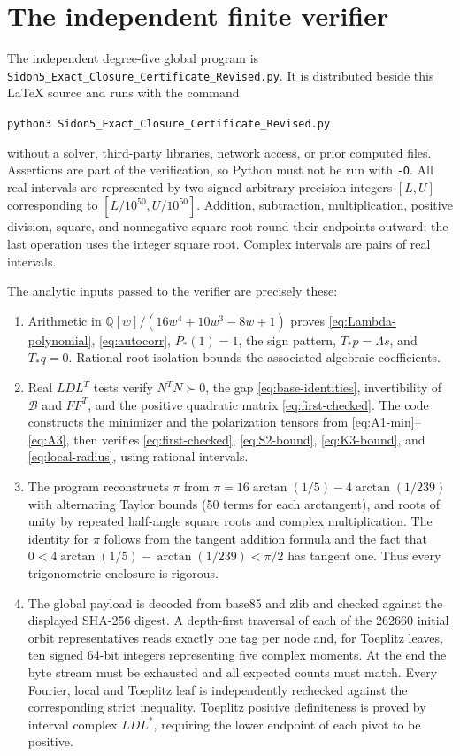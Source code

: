 \documentclass[11pt]{article}
\newcommand{\Q}{\mathbb Q}
\newcommand{\cert}{\texttt{Sidon5\_Exact\_Closure\_Certificate\_Revised.py}}
\begin{document}
\section{The independent finite verifier}\label{app:certificate}

The independent degree-five global program is \cert{}. It is distributed beside this \LaTeX{} source and runs with the command
\begin{center}\texttt{python3 Sidon5\_Exact\_Closure\_Certificate\_Revised.py}\end{center}
without a solver, third-party libraries, network access, or prior computed files. Assertions are part of the verification, so Python must not be run with \texttt{-O}. All real intervals are represented by two signed arbitrary-precision integers $[L,U]$ corresponding to $[L/10^{50},U/10^{50}]$. Addition, subtraction, multiplication, positive division, square, and nonnegative square root round their endpoints outward; the last operation uses the integer square root. Complex intervals are pairs of real intervals.

The analytic inputs passed to the verifier are precisely these:
\begin{enumerate}[leftmargin=*]
\item Arithmetic in $\Q[w]/(16w^4+10w^3-8w+1)$ proves \eqref{eq:Lambda-polynomial}, \eqref{eq:autocorr}, $P_*(1)=1$, the sign pattern, $T_*p=\Lambda s$, and $T_*q=0$. Rational root isolation bounds the associated algebraic coefficients.
\item Real $LDL^T$ tests verify $N^TN\succ0$, the gap \eqref{eq:base-identities}, invertibility of $\mathcal B$ and $FF^T$, and the positive quadratic matrix \eqref{eq:first-checked}. The code constructs the minimizer and the polarization tensors from \eqref{eq:A1-min}--\eqref{eq:A3}, then verifies \eqref{eq:first-checked}, \eqref{eq:S2-bound}, \eqref{eq:K3-bound}, and \eqref{eq:local-radius}, using rational intervals.
\item The program reconstructs $\pi$ from $\pi=16\arctan(1/5)-4\arctan(1/239)$ with alternating Taylor bounds (50 terms for each arctangent), and roots of unity by repeated half-angle square roots and complex multiplication. The identity for $\pi$ follows from the tangent addition formula and the fact that $0<4\arctan(1/5)-\arctan(1/239)<\pi/2$ has tangent one. Thus every trigonometric enclosure is rigorous.
\item The global payload is decoded from base85 and zlib and checked against the displayed SHA-256 digest. A depth-first traversal of each of the 262660 initial orbit representatives reads exactly one tag per node and, for Toeplitz leaves, ten signed 64-bit integers representing five complex moments. At the end the byte stream must be exhausted and all expected counts must match. Every Fourier, local and Toeplitz leaf is independently rechecked against the corresponding strict inequality. Toeplitz positive definiteness is proved by interval complex $LDL^*$, requiring the lower endpoint of each pivot to be positive.
\end{enumerate}
\end{document}

